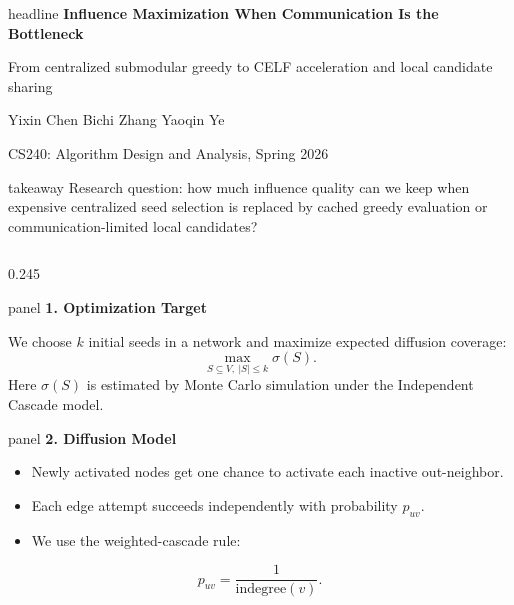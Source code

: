 \documentclass[final]{beamer}
\newcommand{\panel}[2]{%
  \begin{beamercolorbox}[wd=\linewidth,sep=0.46cm,rounded=true]{panel}
    {\color{deepteal}\bfseries\Large #1}\par
    \vspace{0.26cm}
    #2
  \end{beamercolorbox}
}
\begin{document}
\begin{frame}[t]

\begin{beamercolorbox}[wd=\paperwidth,sep=0.98cm]{headline}
  \centering
  {\bfseries\fontsize{54}{62}\selectfont Influence Maximization When Communication Is the Bottleneck}\par
  \vspace{0.30cm}
  {\fontsize{30}{38}\selectfont From centralized submodular greedy to CELF acceleration and local candidate sharing}\par
  \vspace{0.28cm}
  {\fontsize{24}{31}\selectfont Yixin Chen \quad Bichi Zhang \quad Yaoqin Ye}\par
  \vspace{0.10cm}
  {\fontsize{19}{26}\selectfont CS240: Algorithm Design and Analysis, Spring 2026}
\end{beamercolorbox}

\vspace{0.58cm}
\begin{beamercolorbox}[wd=\textwidth,sep=0.50cm,rounded=true]{takeaway}
  \centering
  {\Large Research question: how much influence quality can we keep when expensive centralized seed selection is replaced by cached greedy evaluation or communication-limited local candidates?}
\end{beamercolorbox}

\vspace{0.70cm}
\begin{columns}[t,totalwidth=\textwidth]

\begin{column}{0.245\textwidth}
\vspace{0pt}
\panel{1. Optimization Target}{
  We choose \(k\) initial seeds in a network and maximize expected diffusion coverage:
  \[
    \max_{S\subseteq V,\ |S|\le k}\sigma(S).
  \]
  Here \(\sigma(S)\) is estimated by Monte Carlo simulation under the Independent Cascade model.
}

\vspace{0.50cm}
\panel{2. Diffusion Model}{
  \begin{itemize}
    \item Newly activated nodes get one chance to activate each inactive out-neighbor.
    \item Each edge attempt succeeds independently with probability \(p_{uv}\).
    \item We use the weighted-cascade rule:
  \end{itemize}
  \[
    p_{uv}=\frac{1}{\mathrm{indegree}(v)}.
  \]
}


\end{column}
\end{columns}
\end{frame}
\end{document}

